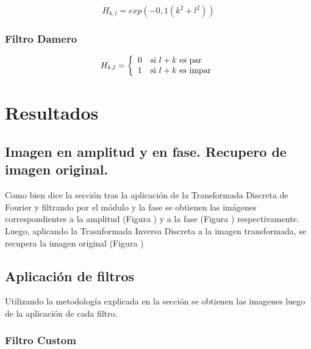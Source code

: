 \documentclass[twocolumn,a4paper,10pt]{article}
\begin{document}
\begin{equation}
    H_{k,l} = exp(-0,1(k^2 + l^2))
\end{equation}


\subsubsection{Filtro Damero}

\begin{equation}
    H_{k,l} = \left\{
                    \begin{array}{c l}
                        0 & \mbox{si } l+k \mbox{ es par} \\
                        1 & \mbox{si } l+k \mbox{ es impar}
                    \end{array}               
               \right.
\end{equation}

\section{Resultados}

\subsection{Imagen en amplitud y en fase. Recupero de imagen original.}

Como bien dice la secci\'on 
tras la aplicaci\'on de la Transformada Discreta de Fourier y filtrando por el m\'odulo y la fase se obtienen las im\'agenes correspondientes a la amplitud
(Figura )
y a la fase (Figura )
respectivamente. \\

Luego, aplicando la Trasnformada Inversa Discreta a la imagen transformada, se recupera la imagen original (Figura )

\subsection{Aplicaci\'on de filtros}

Utilizando la metodolog\'ia explicada en la secci\'on
se obtienen las imagenes luego de la aplicaci\'on de cada filtro. \\

\subsubsection{Filtro Custom}
\end{document}
